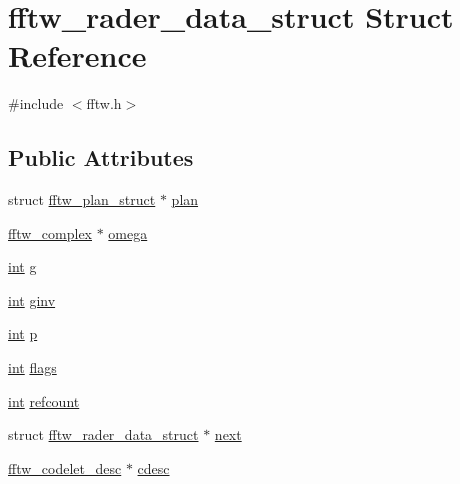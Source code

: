 \hypertarget{structfftw__rader__data__struct}{}\section{fftw\+\_\+rader\+\_\+data\+\_\+struct Struct Reference}
\label{structfftw__rader__data__struct}


{\ttfamily \#include $<$fftw.\+h$>$}

\subsection*{Public Attributes}
\begin{DoxyCompactItemize}
\item 
struct \hyperlink{structfftw__plan__struct}{fftw\+\_\+plan\+\_\+struct} $\ast$ \hyperlink{structfftw__rader__data__struct_aa0fdaee84fabe8a6ecb74ea4a05ab122}{plan}
\item 
\hyperlink{structfftw__complex}{fftw\+\_\+complex} $\ast$ \hyperlink{structfftw__rader__data__struct_ad1d3d661e6e97fae6126859ca63a48ea}{omega}
\item 
\hyperlink{xmltok_8h_a5a0d4a5641ce434f1d23533f2b2e6653}{int} \hyperlink{structfftw__rader__data__struct_ac68beea87d3834df881cd1280844c137}{g}
\item 
\hyperlink{xmltok_8h_a5a0d4a5641ce434f1d23533f2b2e6653}{int} \hyperlink{structfftw__rader__data__struct_a257e9bf9422665e3f326e6785d7e9842}{ginv}
\item 
\hyperlink{xmltok_8h_a5a0d4a5641ce434f1d23533f2b2e6653}{int} \hyperlink{structfftw__rader__data__struct_a7c62f135742d0c0a3303950f78421815}{p}
\item 
\hyperlink{xmltok_8h_a5a0d4a5641ce434f1d23533f2b2e6653}{int} \hyperlink{structfftw__rader__data__struct_a38ce2e82dafdd0d54eeeff4739a8f533}{flags}
\item 
\hyperlink{xmltok_8h_a5a0d4a5641ce434f1d23533f2b2e6653}{int} \hyperlink{structfftw__rader__data__struct_ae8416156b430120934321df66227c97f}{refcount}
\item 
struct \hyperlink{structfftw__rader__data__struct}{fftw\+\_\+rader\+\_\+data\+\_\+struct} $\ast$ \hyperlink{structfftw__rader__data__struct_add6c58655fd3f3a60398822f85d7d5b3}{next}
\item 
\hyperlink{structfftw__codelet__desc}{fftw\+\_\+codelet\+\_\+desc} $\ast$ \hyperlink{structfftw__rader__data__struct_a0dbac3bc83b52b0bd26b716a030d0ee8}{cdesc}
\end{DoxyCompactItemize}


